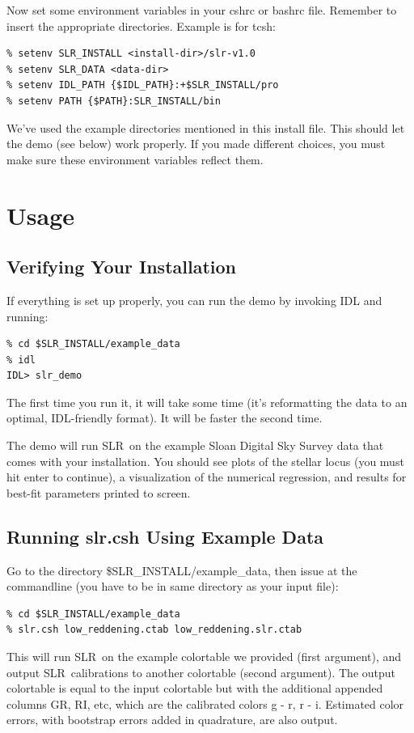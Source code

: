 \documentclass{report}
\newcommand{\slr}{SLR}
\begin{document}
Now set some environment variables in your cshrc or bashrc file. Remember to insert the appropriate directories. Example is for tcsh:
\begin{verbatim}
% setenv SLR_INSTALL <install-dir>/slr-v1.0
% setenv SLR_DATA <data-dir>
% setenv IDL_PATH {$IDL_PATH}:+$SLR_INSTALL/pro
% setenv PATH {$PATH}:SLR_INSTALL/bin
\end{verbatim}

We've used the example directories mentioned in this install
file. This should let the demo (see below) work properly. If you made
different choices, you must make sure these environment variables
reflect them.

\chapter{Usage}

\section{Verifying Your Installation}
\label{sec:verify}

If everything is set up properly, you can run the demo by invoking IDL
and running:
\begin{verbatim}
% cd $SLR_INSTALL/example_data
% idl
IDL> slr_demo
\end{verbatim}

The first time you run it, it will take some time (it's reformatting
the data to an optimal, IDL-friendly format). It will be faster the
second time.

The demo will run \slr\ on the example Sloan Digital Sky Survey data
that comes with your installation. You should see plots of the stellar
locus (you must hit enter to continue), a visualization of the
numerical regression, and results for best-fit parameters printed to
screen.


\section{Running slr.csh Using Example Data}

Go to the directory \$SLR\_INSTALL/example\_data, then issue at
the commandline (you have to be in same directory as your input file):
\begin{verbatim}
% cd $SLR_INSTALL/example_data
% slr.csh low_reddening.ctab low_reddening.slr.ctab
\end{verbatim}

This will run \slr\ on the example colortable we provided (first
argument), and output \slr\ calibrations to another colortable (second
argument). The output colortable is equal to the input colortable but
with the additional appended columns GR, RI, etc, which are the
calibrated colors g - r, r - i. Estimated color errors, with bootstrap
errors added in quadrature, are also output.
\end{document}
